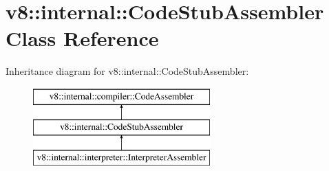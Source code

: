 \hypertarget{classv8_1_1internal_1_1_code_stub_assembler}{}\section{v8\+:\+:internal\+:\+:Code\+Stub\+Assembler Class Reference}
\label{classv8_1_1internal_1_1_code_stub_assembler}
Inheritance diagram for v8\+:\+:internal\+:\+:Code\+Stub\+Assembler\+:\begin{figure}[H]
\begin{center}
\leavevmode
\includegraphics[height=3.000000cm]{classv8_1_1internal_1_1_code_stub_assembler}
\end{center}
\end{figure}
